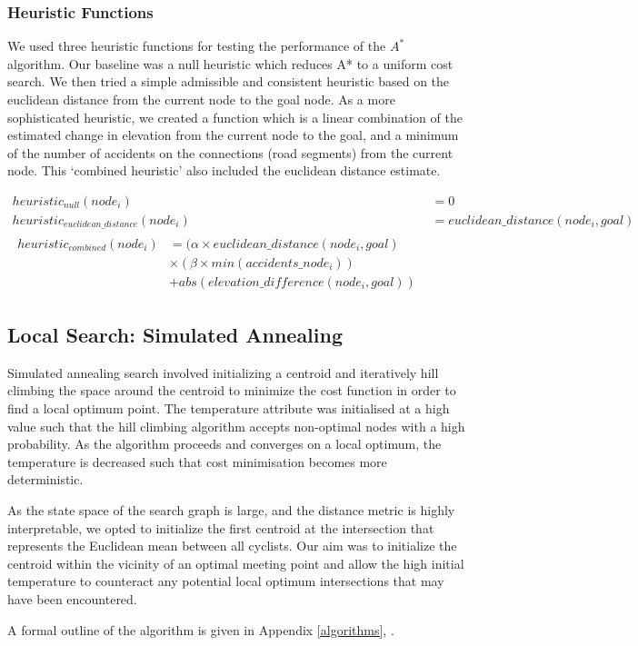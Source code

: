 \documentclass[11pt]{article}
\begin{document}
\subsubsection{Heuristic Functions}
We used three heuristic functions for testing the performance of the $A^{*}$ algorithm. Our baseline was a null heuristic which reduces A* to a uniform cost search. We then tried a simple admissible and consistent heuristic based on the euclidean distance from the current node to the goal node. As a more sophisticated heuristic, we created a function which is a linear combination of the estimated change in elevation from the current node to the goal, and a minimum of the number of accidents on the connections (road segments) from the current node. This `combined heuristic' also included the euclidean distance estimate. 

\begin{align}\label{heuristic_fns}
heuristic_{null}(node_i) &= 0 \\
heuristic_{euclidean\_distance}(node_i) &= euclidean\_distance(node_i, goal)\\
\begin{split}
heuristic_{combined}(node_i) &= (\alpha \times euclidean\_distance(node_i, goal) \\ &\times  (\beta \times min(accidents\_node_i)) \\&+ abs(elevation\_difference(node_i, goal))
\end{split}
\end{align}

\subsection{Local Search: Simulated Annealing}
Simulated annealing search involved initializing a centroid and iteratively hill climbing the space around the centroid to minimize the cost function in order to find a local optimum point. The temperature attribute was initialised at a high value such that the hill climbing algorithm accepts non-optimal nodes with a high probability. As the algorithm proceeds and converges on a local optimum, the temperature is decreased such that cost minimisation becomes more deterministic.
\par
As the state space of the search graph is large, and the distance metric is highly interpretable, we opted to initialize the first centroid at the intersection that represents the Euclidean mean between all cyclists. Our aim was to initialize the centroid within the vicinity of an optimal meeting point and allow the high initial temperature to counteract any potential local optimum intersections that may have been encountered.
\par
A formal outline of the algorithm is given in Appendix \ref{algorithms}, .
\end{document}
